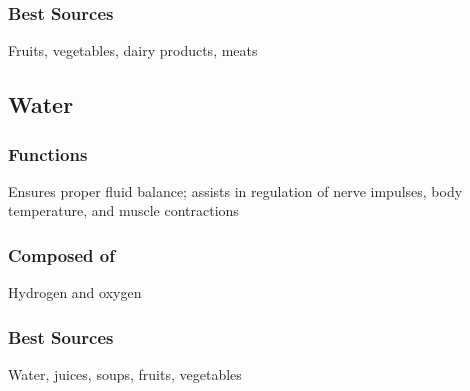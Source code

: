 \documentclass[title={Chapter 1}]{fdsn201notes}
\begin{document}
\subsubsection{Best Sources} Fruits, vegetables, dairy products, meats

\textcolor{nutrientblue}{\subsection{Water}\label{subsec:water}}
\subsubsection{Functions} Ensures proper fluid balance; assists in regulation of nerve impulses, body temperature, and muscle contractions

\subsubsection{Composed of} Hydrogen and oxygen

\subsubsection{Best Sources} Water, juices, soups, fruits, vegetables
\end{document}
